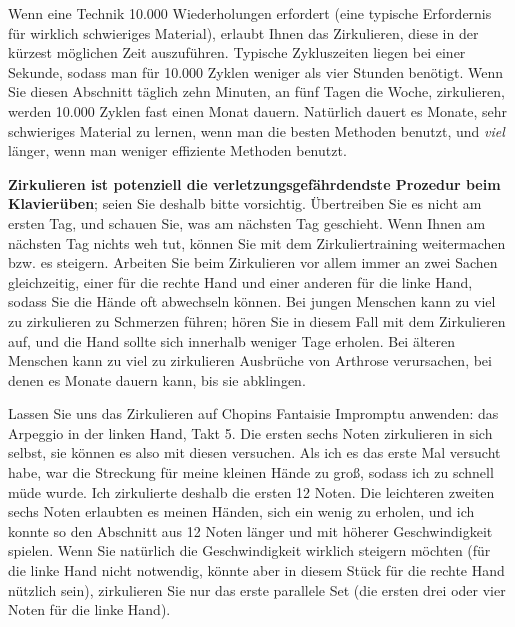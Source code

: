 Wenn eine Technik 10.000 Wiederholungen erfordert (eine typische Erfordernis für wirklich schwieriges Material), erlaubt Ihnen das Zirkulieren, diese in der kürzest möglichen Zeit auszuführen.
Typische Zykluszeiten liegen bei einer Sekunde, sodass man für 10.000 Zyklen weniger als vier Stunden benötigt.
Wenn Sie diesen Abschnitt täglich zehn Minuten, an fünf Tagen die Woche, zirkulieren, werden 10.000 Zyklen fast einen Monat dauern.
Natürlich dauert es Monate, sehr schwieriges Material zu lernen, wenn man die besten Methoden benutzt, und \textit{viel} länger, wenn man weniger effiziente Methoden benutzt.

\textbf{Zirkulieren ist potenziell die verletzungsgefährdendste Prozedur beim Klavierüben}; seien Sie deshalb bitte vorsichtig.
Übertreiben Sie es nicht am ersten Tag, und schauen Sie, was am nächsten Tag geschieht.
Wenn Ihnen am nächsten Tag nichts weh tut, können Sie mit dem Zirkuliertraining weitermachen bzw. es steigern.
Arbeiten Sie beim Zirkulieren vor allem immer an zwei Sachen gleichzeitig, einer für die rechte Hand und einer anderen für die linke Hand, sodass Sie die Hände oft abwechseln können.
Bei jungen Menschen kann zu viel zu zirkulieren zu Schmerzen führen; hören Sie in diesem Fall mit dem Zirkulieren auf, und die Hand sollte sich innerhalb weniger Tage erholen.
Bei älteren Menschen kann zu viel zu zirkulieren Ausbrüche von Arthrose verursachen, bei denen es Monate dauern kann, bis sie abklingen.
 

\hypertarget{c1iii2fi}{}

Lassen Sie uns das Zirkulieren auf Chopins Fantaisie Impromptu anwenden: das Arpeggio in der linken Hand, Takt 5.
Die ersten sechs Noten zirkulieren in sich selbst, sie können es also mit diesen versuchen.
Als ich es das erste Mal versucht habe, war die Streckung für meine kleinen Hände zu groß, sodass ich zu schnell müde wurde.
Ich zirkulierte deshalb die ersten 12 Noten.
Die leichteren zweiten sechs Noten erlaubten es meinen Händen, sich ein wenig zu erholen, und ich konnte so den Abschnitt aus 12 Noten länger und mit höherer Geschwindigkeit spielen.
Wenn Sie natürlich die Geschwindigkeit wirklich steigern möchten (für die linke Hand nicht notwendig, könnte aber in diesem Stück für die rechte Hand nützlich sein), zirkulieren Sie nur das erste parallele Set (die ersten drei oder vier Noten für die linke Hand).

